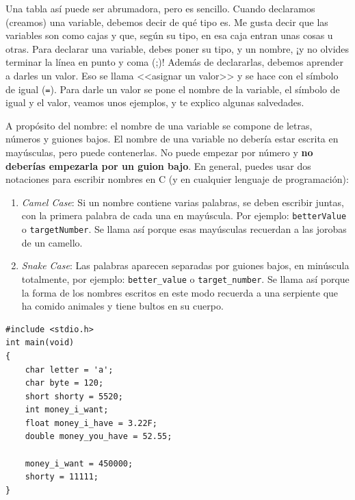 \documentclass[a4paper]{article}
\begin{document}
Una tabla así puede ser abrumadora, pero es sencillo. Cuando declaramos
(creamos) una variable, debemos decir de qué tipo es. Me gusta decir que las
variables son como cajas y que, según su tipo, en esa caja entran unas cosas
u otras. Para declarar una variable, debes poner su tipo, y un nombre, ¡y no
olvides terminar la línea en punto y coma (;)! Además de declararlas, debemos
aprender a darles un valor. Eso se llama <<asignar un valor>> y se hace con el
símbolo de igual (\verb!=!). Para darle un valor se pone el nombre de la
variable, el símbolo de igual y el valor, veamos unos ejemplos, y te explico
algunas salvedades.

A propósito del nombre: el nombre
de una variable se compone de letras, números y guiones bajos.
El nombre de una variable no debería estar escrita en mayúsculas, pero puede
contenerlas.
No puede empezar por número y \textbf{no deberías empezarla por un guion bajo}.
En general, puedes usar dos notaciones para escribir nombres en C
(y en cualquier lenguaje de programación):
\begin{enumerate}
\item \emph{Camel Case}: Si un nombre contiene varias palabras, se deben
escribir juntas, con la primera palabra de cada una en mayúscula. Por ejemplo:
\verb!betterValue! o \verb!targetNumber!. Se llama así porque esas mayúsculas
recuerdan a las jorobas de un camello.
\item \emph{Snake Case}: Las palabras aparecen separadas por guiones bajos,
en minúscula totalmente, por ejemplo: \verb!better_value! o
\verb!target_number!. Se llama así porque la forma de los nombres escritos en
este modo recuerda a una serpiente que ha comido animales y tiene bultos en su
cuerpo.
\end{enumerate}

\noindent
\begin{minipage}[H]{\linewidth}
\mbox{}
\begin{lstlisting}[style=C, caption={Creación y asignación de variables},
label={lst:variableAsignation}]
#include <stdio.h>
int main(void)
{
    char letter = 'a';
    char byte = 120;
    short shorty = 5520;
    int money_i_want;
    float money_i_have = 3.22F;
    double money_you_have = 52.55;

    money_i_want = 450000;
    shorty = 11111;
}
\end{lstlisting}
\end{minipage}
\end{document}
